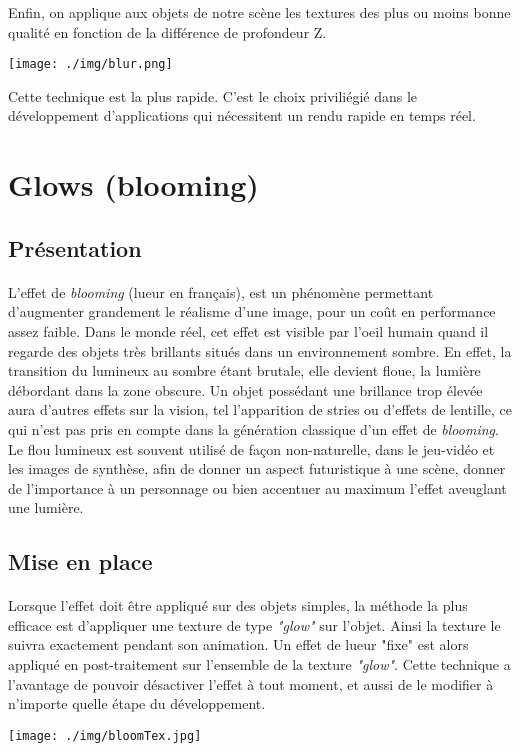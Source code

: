 \documentclass[a4paper]{article}
\begin{document}
Enfin, on applique aux objets de notre scène les textures des plus ou moins bonne qualité en fonction de la différence de profondeur Z.

\begin{center}
\texttt{[image: ./img/blur.png]}
\end{center}

Cette technique est la plus rapide. C'est le choix priviliégié dans le développement d'applications qui nécessitent un rendu rapide en temps réel.


\section{Glows (blooming)}
\subsection{Présentation}

\paragraph{} L'effet de \textit{blooming} (lueur en français), est un phénomène permettant d'aug\-menter grandement le réalisme d'une image, pour un coût en performance assez faible. Dans le monde réel, cet effet est visible par l'oeil humain quand il regarde des objets très brillants situés dans un environnement sombre. En effet, la transition du lumineux au sombre étant brutale, elle devient floue, la lumière débordant dans la zone obscure. Un objet possédant une brillance trop élevée aura d'autres effets sur la vision, tel l'apparition de stries ou d'effets de lentille, ce qui n'est pas pris en compte dans la génération classique d'un effet de \textit{blooming}. Le flou lumineux est souvent utilisé de façon non-naturelle, dans le jeu-vidéo et les images de synthèse, afin de donner un aspect futuristique à une scène, donner de l'importance à un personnage ou bien accentuer au maximum l'effet aveuglant une lumière.

\subsection{Mise en place}

\paragraph{} Lorsque l'effet doit être appliqué sur des objets simples, la méthode la plus efficace est d'appliquer une texture de type \textit{"glow"} sur l'objet. Ainsi la texture le suivra exactement pendant son animation. Un effet de lueur "fixe" est alors appliqué en post-traitement sur l'ensemble de la texture \textit{"glow"}. Cette technique a l'avantage de pouvoir désactiver l'effet à tout moment, et aussi de le modifier à n'importe quelle étape du développement.
\vspace{0.2cm}
\begin{center}
\texttt{[image: ./img/bloomTex.jpg]}
\end{center}
\end{document}
